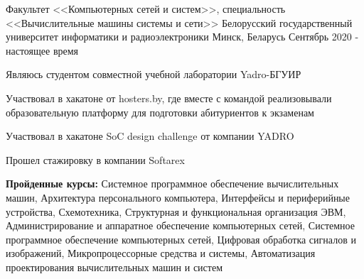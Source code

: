 

\begin{cventries}

  \cventry
    {Факультет <<Компьютерных сетей и систем>>,
    специальность <<Вычислительные машины системы и сети>>} %
    {Белорусский государственный университет информатики и радиоэлектроники} %
    {Минск, Беларусь} %
    {Сентябрь 2020 - настоящее время} %
    {
      \begin{cvitems} %
        \item {Являюсь студентом совместной учебной лаборатории Yadro-БГУИР}
        \item {Участвовал в хакатоне от hosters.by, где вместе с командой реализовывали образовательную 
              платформу для подготовки абитуриентов к экзаменам}
        \item {Участвовал в хакатоне SoC design challenge от компании YADRO}
        \item {Прошел стажировку в компании Softarex}
        \item {\textbf{Пройденные курсы:} 
              Системное программное обеспечение вычислительных машин,
              Архитектура персонального компьютера,
              Интерфейсы и периферийные устройства,
              Схемотехника,
              Структурная и функциональная организация ЭВМ,
              Администрирование и аппаратное обеспечение компьютерных сетей,
              Системное программное обеспечение компьютерных сетей,
              Цифровая обработка сигналов и изображений,
              Микропроцессорные средства и системы,
              Автоматизация проектирования вычислительных машин и систем
              }
      \end{cvitems}
    }
\end{cventries}
